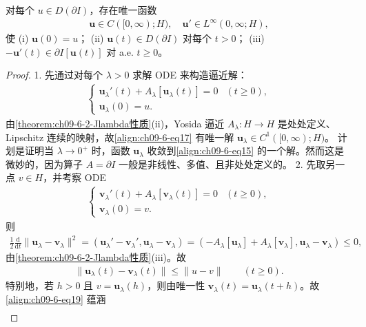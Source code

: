 \documentclass[../../main.tex]{subfiles}
\begin{document}
\begin{theorem}[梯度流的解]\label{theorem:ch09-6-3-梯度流解}
对每个 $u\in D(\partial I)$，存在唯一函数
\begin{align}
\mathbf{u}\in C([0,\infty);H),\quad \mathbf{u}'\in L^\infty(0,\infty;H),\label{align:ch09-6-eq16}
\end{align}
使
(i) $\mathbf{u}(0)=u$；
(ii) $\mathbf{u}(t)\in D(\partial I)$ 对每个 $t>0$；
(iii) $-\mathbf{u}'(t)\in\partial I[\mathbf{u}(t)]$ 对 a.e. $t\geqslant 0$。
\begin{proof}
1. 先通过对每个 $\lambda>0$ 求解 ODE 来构造逼近解：
\begin{align}
\begin{cases}
\mathbf{u}_\lambda'(t)+A_\lambda[\mathbf{u}_\lambda(t)]=0&(t\geqslant 0),\\
\mathbf{u}_\lambda(0)=u.
\end{cases}\label{align:ch09-6-eq17}
\end{align}
由\cref{theorem:ch09-6-2-Jlambda性质}(ii)，Yosida 逼近 $A_\lambda:H\to H$ 是处处定义、Lipschitz 连续的映射，故\eqref{align:ch09-6-eq17} 有唯一解 $\mathbf{u}_\lambda\in C^1([0,\infty);H)$。
计划是证明当 $\lambda\to 0^+$ 时，函数 $\mathbf{u}_\lambda$ 收敛到\eqref{align:ch09-6-eq15} 的一个解。然而这是微妙的，因为算子 $A=\partial I$ 一般是非线性、多值、且非处处定义的。
2. 先取另一点 $v\in H$，并考察 ODE
\begin{align}
\begin{cases}
\mathbf{v}_\lambda'(t)+A_\lambda[\mathbf{v}_\lambda(t)]=0&(t\geqslant 0),\\
\mathbf{v}_\lambda(0)=v.
\end{cases}\label{align:ch09-6-eq18}
\end{align}
则
\begin{align*}
\frac12\frac{\mathrm{d}}{\mathrm{d}t}\|\mathbf{u}_\lambda-\mathbf{v}_\lambda\|^2=(\mathbf{u}_\lambda'-\mathbf{v}_\lambda',\mathbf{u}_\lambda-\mathbf{v}_\lambda)=(-A_\lambda[\mathbf{u}_\lambda]+A_\lambda[\mathbf{v}_\lambda],\mathbf{u}_\lambda-\mathbf{v}_\lambda)\leqslant 0,
\end{align*}
由\cref{theorem:ch09-6-2-Jlambda性质}(iii)。故
\begin{align}
\|\mathbf{u}_\lambda(t)-\mathbf{v}_\lambda(t)\|\leqslant\|u-v\|\qquad (t\geqslant 0).\label{align:ch09-6-eq19}
\end{align}
特别地，若 $h>0$ 且 $v=\mathbf{u}_\lambda(h)$，则由唯一性 $\mathbf{v}_\lambda(t)=\mathbf{u}_\lambda(t+h)$。故\eqref{align:ch09-6-eq19} 蕴涵
\begin{align*}

\end{align*}
\end{proof}
\end{theorem}
\end{document}
